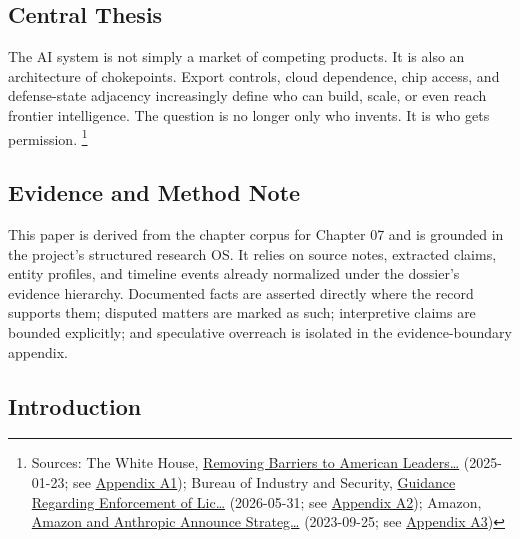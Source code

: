 \documentclass[
  american,
  11pt,
  letterpaper,
]{article}
\begin{document}
\subsection{Central Thesis}\label{central-thesis-7}

The AI system is not simply a market of competing products. It is also
an architecture of chokepoints. Export controls, cloud dependence, chip
access, and defense-state adjacency increasingly define who can build,
scale, or even reach frontier intelligence. The question is no longer
only who invents. It is who gets permission. \footnote{Sources: The
  White House,
  \href{https://www.whitehouse.gov/presidential-actions/2025/01/removing-barriers-to-american-leadership-in-artificial-intelligence/}{Removing
  Barriers to American Leaders\ldots{}} (2025-01-23; see
  \hyperref[ch-07-appendix-a1-removing-barriers-to-american-leadership-in-artificial-intelligence]{Appendix
  A1}); Bureau of Industry and Security,
  \href{https://www.bis.gov/media/documents/bis-guidance-may-31-2026.pdf}{Guidance
  Regarding Enforcement of Lic\ldots{}} (2026-05-31; see
  \hyperref[ch-07-appendix-a2-guidance-regarding-enforcement-of-license-requirements-for-advanced-computing-items-for-entities-headquartered-in-country-group-d-5-and-macau]{Appendix
  A2}); Amazon,
  \href{https://press.aboutamazon.com/2023/9/amazon-and-anthropic-announce-strategic-collaboration-to-advance-generative-ai}{Amazon
  and Anthropic Announce Strateg\ldots{}} (2023-09-25; see
  \hyperref[ch-07-appendix-a3-amazon-and-anthropic-announce-strategic-collaboration-to-advance-generative-ai]{Appendix
  A3})}

\subsection{Evidence and Method Note}\label{evidence-and-method-note-7}

This paper is derived from the chapter corpus for Chapter 07 and is
grounded in the project's structured research OS. It relies on source
notes, extracted claims, entity profiles, and timeline events already
normalized under the dossier's evidence hierarchy. Documented facts are
asserted directly where the record supports them; disputed matters are
marked as such; interpretive claims are bounded explicitly; and
speculative overreach is isolated in the evidence-boundary appendix.

\subsection{Introduction}\label{introduction-7}
\end{document}
